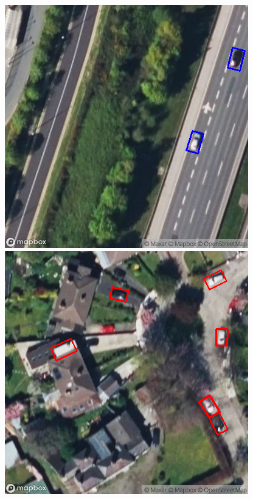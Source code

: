 \begin{figure}[htbp]
    \centering
    \begin{minipage}{0.45\textwidth}
        \centering
        \includegraphics[width=\textwidth]{images/road_mask_classification1.png}
    \end{minipage}
    \hfill
    \begin{minipage}{0.45\textwidth}
        \centering
        \includegraphics[width=\textwidth]{images/road_mask_classification2.png}

\end{minipage}
\end{figure}
